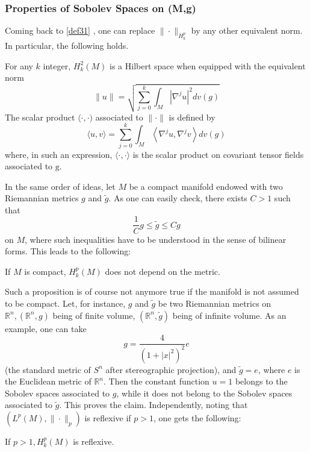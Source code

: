 \documentclass[12pt,hyperref,a4paper,UTF8]{ctexart}
\begin{document}
\subsubsection{Properties of Sobolev Spaces on (M,g)}
Coming back to \autoref{def31} , one can replace $\|\cdot\|_{H_k^p}$ by any other equivalent norm. In particular, the following holds.

\begin{Proposition}
    For any $k$ integer, $H_k^2(M)$ is a Hilbert space when equipped with the equivalent norm
$$
\|u\|=\sqrt{\sum_{j=0}^k \int_M\left|\nabla^j u\right|^2 d v(g)}
$$
The scalar product $\langle\cdot, \cdot)$ associated to $\|\cdot\|$ is defined by
$$
\langle u, v\rangle=\sum_{j=0}^k \int_M\left\langle\nabla^j u, \nabla^j v\right\rangle d v(g)
$$
where, in such an expression, $\langle\cdot, \cdot\rangle$ is the scalar product on covariant tensor fields associated to $\mathrm{g}$.
\label{prp31}
\end{Proposition}

In the same order of ideas, let $M$ be a compact manifold endowed with two Riemannian metrics $g$ and $\tilde{g}$. As one can easily check, there exists $C>1$ such that
$$
\frac{1}{C} g \leq \tilde{g} \leq C g
$$
on $M$, where such inequalities have to be understood in the sense of bilinear forms. This leads to the following:

\begin{Proposition}
    If $M$ is compact, $H_k^p(M)$ does not depend on the metric.
\label{prp32}
\end{Proposition}

Such a proposition is of course not anymore true if the manifold is not assumed to be compact. Let, for instance, $g$ and $\tilde{g}$ be two Riemannian metrics on $\mathbb{R}^n,\left(\mathbb{R}^n, g\right)$ being of finite volume, $\left(\mathbb{R}^n, \tilde{g}\right)$ being of infinite volume. As an example, one can take
$$
g=\frac{4}{\left(1+|x|^2\right)^2} e
$$
(the standard metric of $S^n$ after stereographic projection), and $\tilde{g}=e$, where $e$ is the Euclidean metric of $\mathbb{R}^n$. Then the constant function $u=1$ belongs to the Sobolev spaces associated to $g$, while it does not belong to the Sobolev spaces associated to $\tilde{g}$. This proves the claim. Independently, noting that $\left(L^p(M),\|\cdot\|_p\right)$ is reflexive if $p>1$, one gets the following:

\begin{Proposition}
    If $p>1, H_k^p(M)$ is reflexive.
    \label{prp33}
\end{Proposition}
\end{document}
